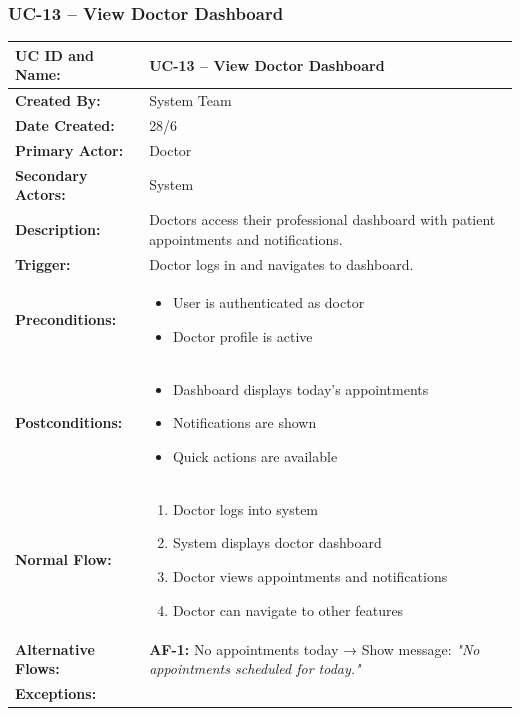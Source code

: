 \documentclass[12pt,a4paper]{article}
\begin{document}
\subsubsection{UC-13 – View Doctor Dashboard}

\renewcommand{\arraystretch}{1.5}
\begin{longtable}{|p{4.5cm}|p{10.5cm}|}
\hline
\textbf{UC ID and Name:} & UC-13 – View Doctor Dashboard \\
\hline
\textbf{Created By:} & System Team \\
\hline
\textbf{Date Created:} & 28/6 \\
\hline
\textbf{Primary Actor:} & Doctor \\
\hline
\textbf{Secondary Actors:} & System \\
\hline
\textbf{Description:} & Doctors access their professional dashboard with patient appointments and notifications. \\
\hline
\textbf{Trigger:} & Doctor logs in and navigates to dashboard. \\
\hline
\textbf{Preconditions:} &
\begin{itemize}
  \item User is authenticated as doctor
  \item Doctor profile is active
\end{itemize} \\
\hline
\textbf{Postconditions:} &
\begin{itemize}
  \item Dashboard displays today's appointments
  \item Notifications are shown
  \item Quick actions are available
\end{itemize} \\
\hline
\textbf{Normal Flow:} &
\begin{enumerate}
  \item Doctor logs into system
  \item System displays doctor dashboard
  \item Doctor views appointments and notifications
  \item Doctor can navigate to other features
\end{enumerate} \\
\hline
\textbf{Alternative Flows:} &
\textbf{AF-1:} No appointments today → Show message: \textit{"No appointments scheduled for today."} \\
\hline
\textbf{Exceptions:} &
\begin{itemize}

\end{itemize}
\end{longtable}
\end{document}
